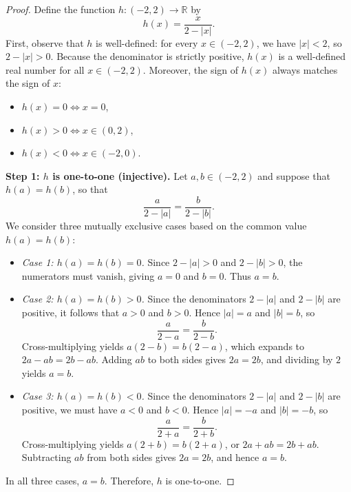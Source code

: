 \documentclass[11pt, letterpaper]{article}
\theoremstyle{definition}
\theoremstyle{remark}
\begin{document}
\begin{proof}
Define the function $h : (-2, 2) \to \mathbb{R}$ by
\[
h(x) = \frac{x}{2 - |x|}.
\]
First, observe that $h$ is well-defined: for every $x \in (-2, 2)$, we have $|x| < 2$, so $2 - |x| > 0$. Because the denominator is strictly positive, $h(x)$ is a well-defined real number for all $x \in (-2, 2)$. Moreover, the sign of $h(x)$ always matches the sign of $x$:
\begin{itemize}
    \item $h(x) = 0 \iff x = 0$,
    \item $h(x) > 0 \iff x \in (0, 2)$,
    \item $h(x) < 0 \iff x \in (-2, 0)$.
\end{itemize}

\textbf{Step 1: $h$ is one-to-one (injective).}
Let $a, b \in (-2, 2)$ and suppose that $h(a) = h(b)$, so that
\[
\frac{a}{2 - |a|} = \frac{b}{2 - |b|}.
\]
We consider three mutually exclusive cases based on the common value $h(a) = h(b)$:
\begin{itemize}
    \item \emph{Case 1: $h(a) = h(b) = 0$.} Since $2 - |a| > 0$ and $2 - |b| > 0$, the numerators must vanish, giving $a = 0$ and $b = 0$. Thus $a = b$.
    \item \emph{Case 2: $h(a) = h(b) > 0$.} Since the denominators $2 - |a|$ and $2 - |b|$ are positive, it follows that $a > 0$ and $b > 0$. Hence $|a| = a$ and $|b| = b$, so
    \[
    \frac{a}{2 - a} = \frac{b}{2 - b}.
    \]
    Cross-multiplying yields $a(2 - b) = b(2 - a)$, which expands to $2a - ab = 2b - ab$. Adding $ab$ to both sides gives $2a = 2b$, and dividing by $2$ yields $a = b$.
    \item \emph{Case 3: $h(a) = h(b) < 0$.} Since the denominators $2 - |a|$ and $2 - |b|$ are positive, we must have $a < 0$ and $b < 0$. Hence $|a| = -a$ and $|b| = -b$, so
    \[
    \frac{a}{2 + a} = \frac{b}{2 + b}.
    \]
    Cross-multiplying yields $a(2 + b) = b(2 + a)$, or $2a + ab = 2b + ab$. Subtracting $ab$ from both sides gives $2a = 2b$, and hence $a = b$.
\end{itemize}
In all three cases, $a = b$. Therefore, $h$ is one-to-one.


\end{proof}
\end{document}
